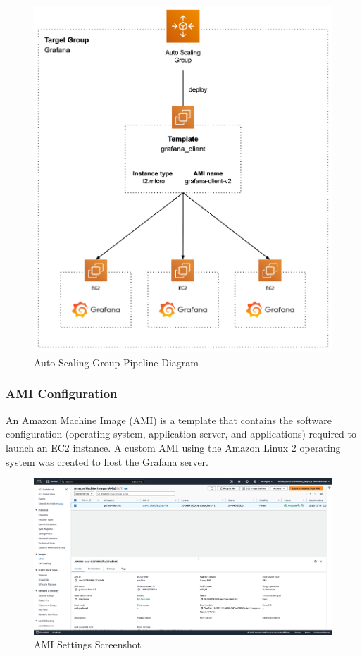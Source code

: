 \documentclass[12pt,oneside]{book} %
\begin{document}
\begin{figure}[H]
    \centering
    \includegraphics[width=1\linewidth]{images/grafana.png}
    \caption{Auto Scaling Group Pipeline Diagram}
\end{figure}

\newpage
\subsubsection{AMI Configuration}

An Amazon Machine Image (AMI) is a template that contains the software
configuration (operating system, application server, and applications) required
to launch an EC2 instance. A custom AMI using the Amazon Linux 2 operating
system was created to host the Grafana server.

\begin{figure}[H]
    \centering
    \includegraphics[width=1\linewidth]{images/ami.png}
    \caption{AMI Settings Screenshot}
\end{figure}
\end{document}
